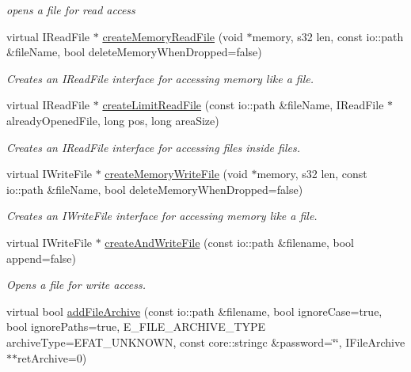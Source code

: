 \begin{DoxyCompactItemize}
\begin{DoxyCompactList}\small\item\em opens a file for read access \end{DoxyCompactList}\item 
virtual I\-Read\-File $\ast$ \hyperlink{classirr_1_1io_1_1_c_file_system_a7376b00818669926d308e5f8176dfdb0}{create\-Memory\-Read\-File} (void $\ast$memory, s32 len, const io\-::path \&file\-Name, bool delete\-Memory\-When\-Dropped=false)
\begin{DoxyCompactList}\small\item\em Creates an I\-Read\-File interface for accessing memory like a file. \end{DoxyCompactList}\item 
virtual I\-Read\-File $\ast$ \hyperlink{classirr_1_1io_1_1_c_file_system_a56a8b684a26c4b86510b8187a727c2f3}{create\-Limit\-Read\-File} (const io\-::path \&file\-Name, I\-Read\-File $\ast$already\-Opened\-File, long pos, long area\-Size)
\begin{DoxyCompactList}\small\item\em Creates an I\-Read\-File interface for accessing files inside files. \end{DoxyCompactList}\item 
virtual I\-Write\-File $\ast$ \hyperlink{classirr_1_1io_1_1_c_file_system_a1ff14dd862a90cd474fe2a8ecaf92bad}{create\-Memory\-Write\-File} (void $\ast$memory, s32 len, const io\-::path \&file\-Name, bool delete\-Memory\-When\-Dropped=false)
\begin{DoxyCompactList}\small\item\em Creates an I\-Write\-File interface for accessing memory like a file. \end{DoxyCompactList}\item 
\hypertarget{classirr_1_1io_1_1_c_file_system_a247d85e560ff6355f596817dadf8cc66}{virtual I\-Write\-File $\ast$ \hyperlink{classirr_1_1io_1_1_c_file_system_a247d85e560ff6355f596817dadf8cc66}{create\-And\-Write\-File} (const io\-::path \&filename, bool append=false)}\label{classirr_1_1io_1_1_c_file_system_a247d85e560ff6355f596817dadf8cc66}

\begin{DoxyCompactList}\small\item\em Opens a file for write access. \end{DoxyCompactList}\item 
\hypertarget{classirr_1_1io_1_1_c_file_system_a26126f856b0ffbf08beaf9e8cd943bc5}{virtual bool \hyperlink{classirr_1_1io_1_1_c_file_system_a26126f856b0ffbf08beaf9e8cd943bc5}{add\-File\-Archive} (const io\-::path \&filename, bool ignore\-Case=true, bool ignore\-Paths=true, E\-\_\-\-F\-I\-L\-E\-\_\-\-A\-R\-C\-H\-I\-V\-E\-\_\-\-T\-Y\-P\-E archive\-Type=E\-F\-A\-T\-\_\-\-U\-N\-K\-N\-O\-W\-N, const core\-::stringc \&password=\char`\"{}\char`\"{}, I\-File\-Archive $\ast$$\ast$ret\-Archive=0)}\label{classirr_1_1io_1_1_c_file_system_a26126f856b0ffbf08beaf9e8cd943bc5}


\end{DoxyCompactItemize}
